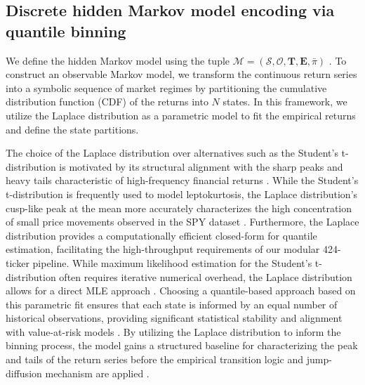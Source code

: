 \documentclass[11pt, letterpaper]{article}
\begin{document}
\subsection{Discrete hidden Markov model encoding via quantile binning}

We define the hidden Markov model using the tuple $\mathcal{M} = (\mathcal{S}, \mathcal{O}, \mathbf{T}, \mathbf{E}, \bar{\pi})$ \cite{rabiner_introduction_1986}. To construct an observable Markov model, we transform the continuous return series into a symbolic sequence of market regimes by partitioning the cumulative distribution function (CDF) of the returns into $N$ states. In this framework, we utilize the Laplace distribution as a parametric model to fit the empirical returns and define the state partitions.

The choice of the Laplace distribution over alternatives such as the Student's t-distribution is motivated by its structural alignment with the sharp peaks and heavy tails characteristic of high-frequency financial returns \cite{cont_empirical_2001, kotz_laplace_2001}. While the Student's t-distribution is frequently used to model leptokurtosis, the Laplace distribution's cusp-like peak at the mean more accurately characterizes the high concentration of small price movements observed in the SPY dataset \cite{mandelbrot_variation_1963, harwood_against_2019}. Furthermore, the Laplace distribution provides a computationally efficient closed-form for quantile estimation, facilitating the high-throughput requirements of our modular 424-ticker pipeline. While maximum likelihood estimation for the Student's t-distribution often requires iterative numerical overhead, the Laplace distribution allows for a direct MLE approach \cite{bilmes_gentle_nodate}. Choosing a quantile-based approach based on this parametric fit ensures that each state is informed by an equal number of historical observations, providing significant statistical stability and alignment with value-at-risk models \cite{manganelli_2004}. By utilizing the Laplace distribution to inform the binning process, the model gains a structured baseline for characterizing the peak and tails of the return series before the empirical transition logic and jump-diffusion mechanism are applied \cite{kou_jump-diffusion_2002}.
\end{document}

